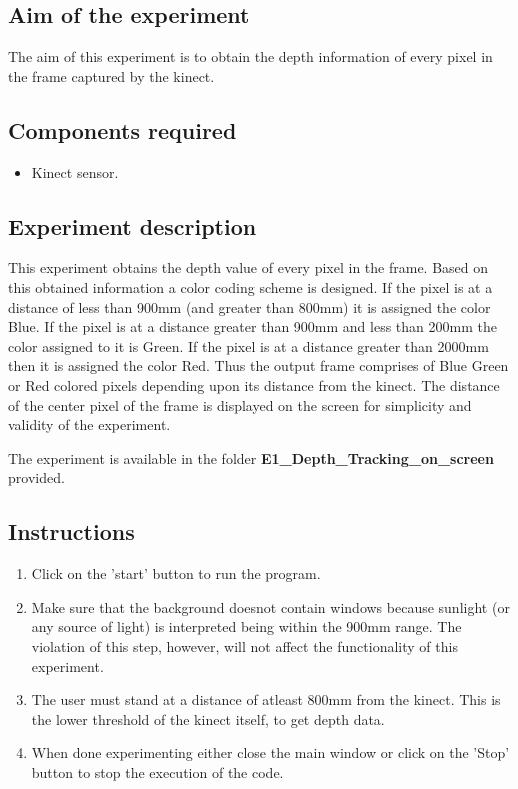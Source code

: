 \begin{flushleft}
\medskip
\subsection{\textbf{ Aim of the experiment}}
The aim of this experiment is to obtain the depth information of every pixel in the frame captured by the kinect.
\medskip

\subsection{\textbf{ Components required}}
\begin{itemize}
\item Kinect sensor.
 \end{itemize}
\medskip

\subsection{\textbf{ Experiment description}}
This experiment obtains the depth value of every pixel in the frame. Based on this obtained information a color coding scheme is designed. If the pixel is at a distance of less than 900mm (and greater than 800mm) it is assigned the color Blue. If the pixel is at a distance greater than 900mm and less than 200mm the color assigned to it is Green. If the pixel is at a distance greater than 2000mm then it is assigned the color Red. Thus the output frame comprises of Blue Green or Red colored pixels depending upon its distance from the kinect. 
The distance of the center pixel of the frame is displayed on the screen for simplicity and validity of the experiment.

\medskip
The experiment is available in the folder \textbf{E1\_Depth\_Tracking\_on\_screen} provided.
\medskip

\subsection{\textbf{ Instructions}}
\begin{enumerate}

\item Click on the 'start' button to run the program.
\item Make sure that the background doesnot contain windows because sunlight (or any source of light) is interpreted being within the 900mm range. The violation of this step, however, will not affect the functionality of this experiment.
\item The user must stand at a distance of atleast 800mm from the kinect. This is the lower threshold of the kinect itself, to get depth data.
\item When done experimenting either close the main window or click on the 'Stop' button to stop the execution of the code.


\end{enumerate}
\end{flushleft}
